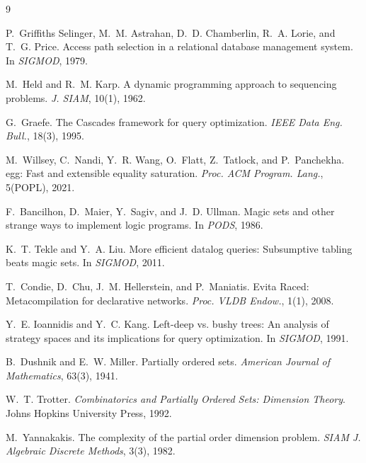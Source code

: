 \documentclass[sigconf,nonacm]{acmart}
\theoremstyle{definition}
\theoremstyle{plain}
\theoremstyle{remark}
\begin{document}
\begin{thebibliography}{9}

P.~Griffiths Selinger, M.~M. Astrahan, D.~D. Chamberlin, R.~A. Lorie,
and T.~G. Price.
\newblock Access path selection in a relational database management
system.
\newblock In \emph{SIGMOD}, 1979.

M.~Held and R.~M. Karp.
\newblock A dynamic programming approach to sequencing problems.
\newblock \emph{J. SIAM}, 10(1), 1962.

G.~Graefe.
\newblock The Cascades framework for query optimization.
\newblock \emph{IEEE Data Eng. Bull.}, 18(3), 1995.

M.~Willsey, C.~Nandi, Y.~R. Wang, O.~Flatt, Z.~Tatlock, and
P.~Panchekha.
\newblock egg: Fast and extensible equality saturation.
\newblock \emph{Proc. ACM Program. Lang.}, 5(POPL), 2021.

F.~Bancilhon, D.~Maier, Y.~Sagiv, and J.~D. Ullman.
\newblock Magic sets and other strange ways to implement logic
programs.
\newblock In \emph{PODS}, 1986.

K.~T. Tekle and Y.~A. Liu.
\newblock More efficient datalog queries: Subsumptive tabling beats
magic sets.
\newblock In \emph{SIGMOD}, 2011.

T.~Condie, D.~Chu, J.~M. Hellerstein, and P.~Maniatis.
\newblock Evita Raced: Metacompilation for declarative networks.
\newblock \emph{Proc. VLDB Endow.}, 1(1), 2008.

Y.~E. Ioannidis and Y.~C. Kang.
\newblock Left-deep vs. bushy trees: An analysis of strategy spaces
and its implications for query optimization.
\newblock In \emph{SIGMOD}, 1991.

B.~Dushnik and E.~W. Miller.
\newblock Partially ordered sets.
\newblock \emph{American Journal of Mathematics}, 63(3), 1941.

W.~T. Trotter.
\newblock \emph{Combinatorics and Partially Ordered Sets: Dimension
Theory}.
\newblock Johns Hopkins University Press, 1992.

M.~Yannakakis.
\newblock The complexity of the partial order dimension problem.
\newblock \emph{SIAM J. Algebraic Discrete Methods}, 3(3), 1982.


\end{thebibliography}
\end{document}
